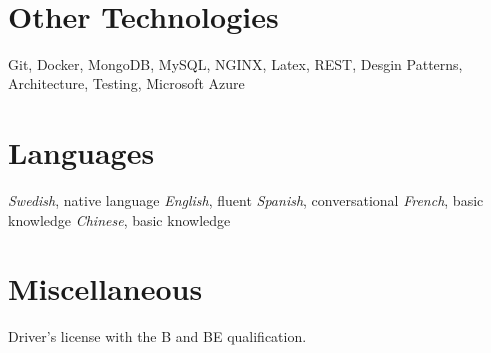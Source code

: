 \documentclass[]{k-cv} %
\begin{document}
\begin{aside}
~
~\color{gray}
\section{Other Technologies}
Git, Docker, MongoDB, MySQL, NGINX, Latex, REST, Desgin Patterns, Architecture, Testing, Microsoft Azure

\section{Languages}
\textit{Swedish}, native language
\textit{English}, fluent
\textit{Spanish}, conversational
\textit{French}, basic knowledge
\textit{Chinese}, basic knowledge
\section{Miscellaneous}
Driver's license with the B and BE qualification.
\end{aside}
\end{document}
